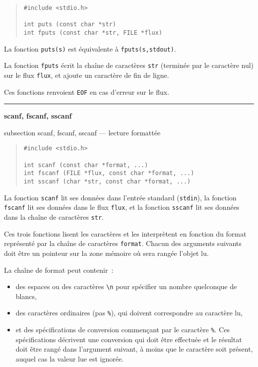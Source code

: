 \documentclass [twoside] {report}
\newcommand {\primitive} [1]
    {
	{\large \bf #1}
	\addcontentsline {toc} {subsection} {#1}
    }
\newcommand {\separation}
    {
	\vspace {7mm}
	\nopagebreak
	\hrule
    }
\begin{document}
\begin {quote}
\begin {verbatim}
#include <stdio.h>

int puts (const char *str)
int fputs (const char *str, FILE *flux)
\end{verbatim}
\end {quote}

La fonction {\tt puts(s)} est équivalente à {\tt fputs(s,stdout)}.

La fonction {\tt fputs} écrit la chaîne de caractères {\tt str}
(terminée par le caractère nul) sur le flux {\tt flux},
et ajoute un caractère de fin de ligne.

Ces fonctions renvoient {\tt EOF} en cas d'erreur sur le flux.


\separation
\primitive {scanf, fscanf, sscanf} --- lecture formattée

\begin {quote}
\begin {verbatim}
#include <stdio.h>

int scanf (const char *format, ...)
int fscanf (FILE *flux, const char *format, ...)
int sscanf (char *str, const char *format, ...)
\end{verbatim}
\end {quote}

La fonction {\tt scanf} lit ses données dans l'entrée
standard ({\tt stdin}), la fonction {\tt fscanf} lit ses données
dans le flux {\tt flux}, et la fonction {\tt sscanf} lit ses
données dans la chaîne de caractères {\tt str}.

Ces trois fonctions lisent les caractères et les interprètent en
fonction du format représenté par la chaîne de caractères {\tt format}.
Chacun des arguments suivants doit être un pointeur sur la zone mémoire
où sera rangée l'objet lu.

La chaîne de format peut contenir~:

\begin {itemize}
    \item des espaces ou des caractères \verb:\n: pour spécifier un
	nombre quelconque de blancs, \par
    \item des caractères ordinaires (pas {\tt \%}), qui doivent
	correspondre au caractère lu, \par
    \item et des spécifications de conversion commençant par le
	caractère {\tt \%}. Ces spécifications décrivent une conversion
	qui doit être effectuée et le résultat doit être rangé dans
	l'argument suivant, à moins que le caractère {\tt *} soit
	présent, auquel cas la valeur lue est ignorée.
\end {itemize}
\end{document}
